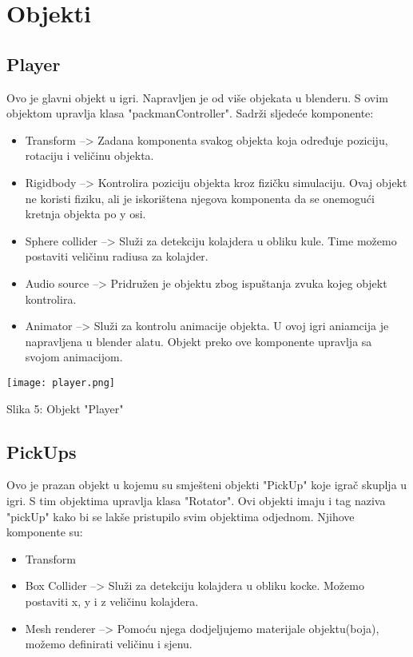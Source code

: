 \section{Objekti}



\subsection{Player}
Ovo je glavni objekt u igri. Napravljen je od više objekata u blenderu. S ovim objektom upravlja klasa "packmanController". Sadrži sljedeće komponente:
\begin{itemize}
\item Transform --> Zadana komponenta svakog objekta koja određuje poziciju, rotaciju i veličinu objekta.

\item Rigidbody --> Kontrolira poziciju objekta kroz fizičku simulaciju. Ovaj objekt ne koristi fiziku, ali je iskorištena njegova komponenta da se onemogući kretnja objekta po y osi.

\item Sphere collider --> Služi za detekciju kolajdera u obliku kule. Time možemo postaviti veličinu radiusa za kolajder.

\item Audio source --> Pridružen je objektu zbog ispuštanja zvuka kojeg objekt kontrolira.

\item Animator --> Služi za kontrolu animacije objekta. U ovoj igri aniamcija je napravljena u blender alatu. Objekt preko ove komponente upravlja sa svojom animacijom.

\end{itemize}

\begin{center}
	\texttt{[image: player.png]}
	
	Slika 5: Objekt "Player"
\end{center}
\subsection{PickUps}
Ovo je prazan objekt u kojemu su smješteni objekti "PickUp" koje igrač skuplja u igri. S tim objektima upravlja klasa "Rotator". Ovi objekti imaju i tag naziva "pickUp" kako bi se lakše pristupilo svim objektima odjednom. Njihove komponente su:

\begin{itemize}
\item Transform

\item Box Collider --> Služi za detekciju kolajdera u obliku kocke.
Možemo postaviti x, y i z veličinu kolajdera.

\item Mesh renderer --> Pomoću njega dodjeljujemo materijale objektu(boja), možemo definirati veličinu i sjenu. 

\end{itemize}

